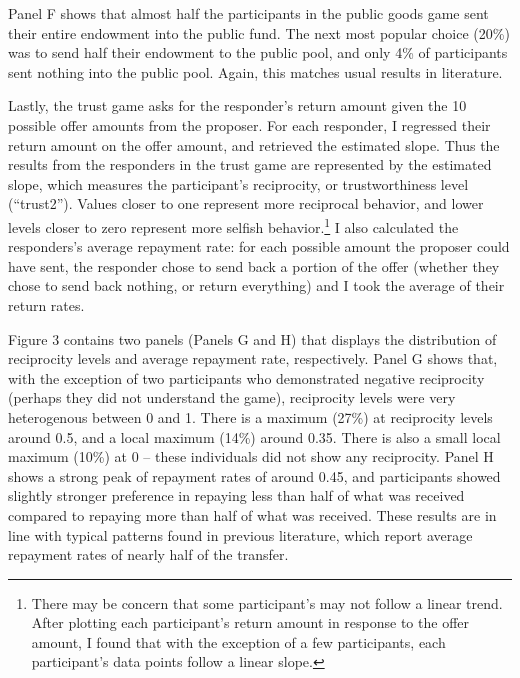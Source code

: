 \documentclass[12pt]{article}
\begin{document}
Panel F shows that almost half the participants in the public goods game sent their entire endowment into the public fund. The next most popular choice (20\%) was to send half their endowment to the public pool, and only 4\% of participants sent nothing into the public pool. Again, this matches usual results in literature.

Lastly, the trust game asks for the responder\rq s return amount given the 10 possible offer amounts from the proposer. For each responder, I regressed their return amount on the offer amount, and retrieved the estimated slope. Thus the results from the responders in the trust game are represented by the estimated slope, which measures the participant\rq s reciprocity, or trustworthiness level (``trust2''). Values closer to one represent more reciprocal behavior, and lower levels closer to zero represent more selfish behavior.\footnote{There may be concern that some participant\rq s may not follow a linear trend. After plotting each participant\rq s return amount in response to the offer amount, I found that with the exception of a few participants, each participant\rq s data points follow a linear slope.} I also calculated the responders\rq s average repayment rate: for each possible amount the proposer could have sent, the responder chose to send back a portion of the offer (whether they chose to send back nothing, or return everything) and I took the average of their return rates.

Figure 3 contains two panels (Panels G and H) that displays the distribution of reciprocity levels and average repayment rate, respectively. Panel G shows that, with the exception of two participants who demonstrated negative reciprocity (perhaps they did not understand the game), reciprocity levels were very heterogenous between 0 and 1. There is a maximum (27\%) at reciprocity levels around 0.5, and a local maximum (14\%) around 0.35. There is also a small local maximum (10\%) at 0 -- these individuals did not show any reciprocity. Panel H shows a strong peak of repayment rates of around 0.45, and participants showed slightly stronger preference in repaying less than half of what was received compared to repaying more than half of what was received. These results are in line with typical patterns found in previous literature, which report average repayment rates of nearly half of the transfer.
\end{document}
